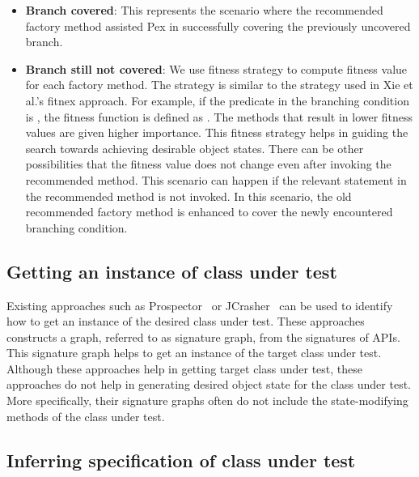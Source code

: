 \begin{itemize}
\item \textbf{Branch covered}: This represents the scenario where the recommended factory method assisted Pex in successfully covering the previously uncovered branch.
\item \textbf{Branch still not covered}: We use fitness strategy to compute fitness value for each factory method. The strategy is similar to the strategy used in Xie et al.'s fitnex approach. For example, if the predicate in the branching condition is , the fitness function is defined as . The methods that result in lower fitness values are given higher importance. This fitness strategy helps in guiding the search towards achieving desirable object states. There can be other possibilities that the fitness value does not change even after invoking the recommended method. This scenario can happen if the relevant statement in the recommended method is not invoked. In this scenario, the old recommended factory method is enhanced to cover the newly encountered branching condition.
\end{itemize}


\subsection{Getting an instance of class under test}

Existing approaches such as Prospector~\cite{prospector:jungloid} or JCrasher~\cite{csallner:jcrasher} can be used to identify how to get an instance of the desired class under test. These approaches constructs a graph, referred to as signature graph, from the signatures of APIs. This signature graph helps to get an instance of the target class under test. Although these approaches help in getting target class under test, these approaches do not help in generating desired object state for the class under test. More specifically, their signature graphs often do not include the state-modifying methods of the class under test.

\subsection{Inferring specification of class under test}

